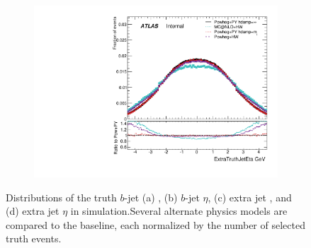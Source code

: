 \begin{figure}
\begin{subfigure}[]{0.45\textwidth}
\includegraphics[width=\textwidth]{fig/MCComp/ExtraTruthJetEta.pdf}
\end{subfigure}
\caption{Distributions of the truth $b$-jet (a) \pt, (b) $b$-jet $\eta$, (c) extra jet  \pt, and (d) extra jet $\eta$ in \ttbar simulation.Several alternate physics models are compared to the baseline, each normalized by the number of selected truth events.}
\label{fig:truthbjet}
\end{figure}

\clearpage
